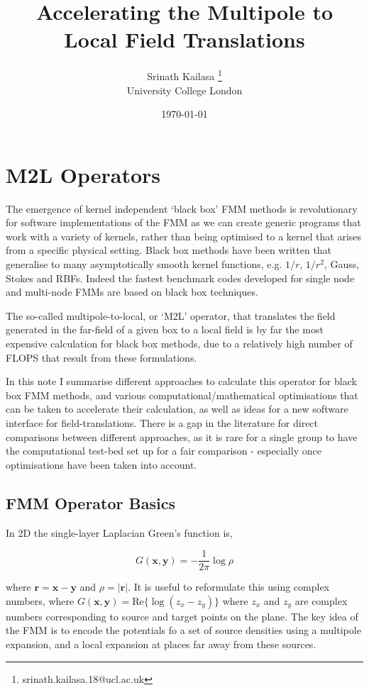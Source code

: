 \documentclass[12pt, a4, twoside]{article}
\title{Accelerating the Multipole to Local Field Translations}
\author{Srinath Kailasa \thanks{srinath.kailasa.18@ucl.ac.uk} \\ \small University College London}
\date{\today}
\begin{document}
\maketitle

\tableofcontents

\section{M2L Operators}
The emergence of kernel independent `black box' FMM methods \cite{Fong2009, Ying2004} is revolutionary for software implementations of the FMM as we can create generic programs that work with a variety of kernels, rather than being optimised to a kernel that arises from a specific physical setting. Black box methods have been written that generalise to many asymptotically smooth kernel functions, e.g. $1/r$, $1/r^2$, Gauss, Stokes and RBFs. Indeed the fastest benchmark codes developed for single node \cite{wang2021exafmm} and multi-node \cite{Malhotra2015} FMMs are based on black box techniques.

The so-called multipole-to-local, or `M2L' operator, that translates the field generated in the far-field of a given box to a local field is by far the most expensive calculation for black box methods, due to a relatively high number of FLOPS that result from these formulations.

In this note I summarise different approaches to calculate this operator for black box FMM methods, and various computational/mathematical optimisations that can be taken to accelerate their calculation, as well as ideas for a new software interface for field-translations. There is a gap in the literature for direct comparisons between different approaches, as it is rare for a single group to have the computational test-bed set up for a fair comparison - especially once optimisations have been taken into account.

\subsection{FMM Operator Basics}

In 2D the single-layer Laplacian Green's function is,

\begin{equation}
    G(\mathbf{x}, \mathbf{y}) = -\frac{1}{2\pi} \log \rho
\end{equation}

where $\mathbf{r} = \mathbf{x} - \mathbf{y}$ and $\rho = |\mathbf{r}|$. It is useful to reformulate this using complex numbers, where $G(\mathbf{x}, \mathbf{y}) = \text{Re}\{ \log(z_x - z_y) \}$ where $z_x$ and $z_y$ are complex numbers corresponding to source and target points on the plane. The key idea of the FMM is to encode the potentials fo a set of source densities using a multipole expansion, and a local expansion at places far away from these sources.
\end{document}
